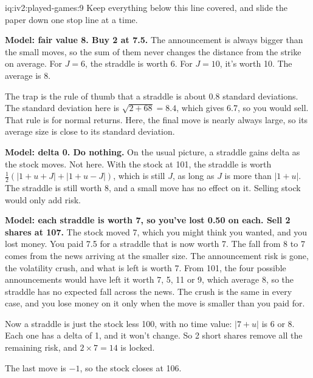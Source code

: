 \begin{solution}{iq:iv2:played-games:9}
Keep everything below this line covered, and slide the paper down one stop line at a time.

\ivstop
\textbf{Model: fair value 8. Buy 2 at 7.5.} The announcement is always bigger than the small moves, so the sum of them never changes the distance from the strike on average. For $J = 6$, the straddle is worth 6. For $J = 10$, it's worth 10. The average is 8.

The trap is the rule of thumb that a straddle is about 0.8 standard deviations. The standard deviation here is $\sqrt{2 + 68} = 8.4$, which gives 6.7, so you would sell. That rule is for normal returns. Here, the final move is nearly always large, so its average size is close to its standard deviation.

\ivstop
\textbf{Model: delta 0. Do nothing.} On the usual picture, a straddle gains delta as the stock moves. Not here. With the stock at 101, the straddle is worth $\tfrac12(|1 + u + J| + |1 + u - J|)$, which is still $J$, as long as $J$ is more than $|1 + u|$. The straddle is still worth 8, and a small move has no effect on it. Selling stock would only add risk.

\ivstop
\textbf{Model: each straddle is worth 7, so you've lost 0.50 on each. Sell 2 shares at 107.} The stock moved 7, which you might think you wanted, and you lost money. You paid 7.5 for a straddle that is now worth 7. The fall from 8 to 7 comes from the news arriving at the smaller size. The announcement risk is gone, the volatility crush, and what is left is worth 7. From 101, the four possible announcements would have left it worth 7, 5, 11 or 9, which average 8, so the straddle has no expected fall across the news. The crush is the same in every case, and you lose money on it only when the move is smaller than you paid for.

Now a straddle is just the stock less 100, with no time value: $|7 + u|$ is 6 or 8. Each one has a delta of 1, and it won't change. So 2 short shares remove all the remaining risk, and $2 \times 7 = 14$ is locked.

The last move is $-1$, so the stock closes at 106.


\end{solution}
